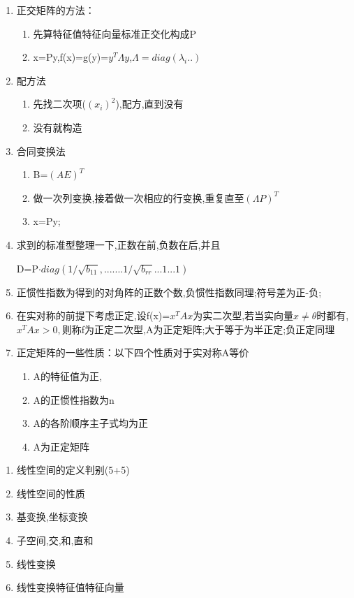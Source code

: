 \documentclass[11pt, a4paper, UTF8]{ctexart}
\begin{document}
\begin{solution}
\begin{enumerate}
  \item 正交矩阵的方法：
  \begin{enumerate}
    \item 先算特征值特征向量标准正交化构成P
    \item x=Py,f(x)=g(y)=$y^{T}\Lambda y$,$\Lambda =diag(\lambda _i..)$
  \end{enumerate}
  \item 配方法
  \begin{enumerate}
    \item 先找二次项($(x_i)^{2}$),配方,直到没有
    \item 没有就构造 
  \end{enumerate}
  \item 合同变换法
  \begin{enumerate}
    \item B=$(A E)^{T}$
    \item 做一次列变换,接着做一次相应的行变换,重复直至$(\Lambda P)^{T}$
    \item x=Py;
  \end{enumerate}
  \item 求到的标准型整理一下,正数在前,负数在后,并且
  
  D=P$\cdot diag(1/\sqrt{b_{11}},.......1/\sqrt{b_{rr}}...1...1)$
  \item 正惯性指数为得到的对角阵的正数个数,负惯性指数同理;符号差为正-负;
  \item 在实对称的前提下考虑正定,设f(x)=$x^{T}Ax$为实二次型,若当实向量$x\neq \theta $时都有,$x^{T}Ax>0,$则称f为正定二次型,A为正定矩阵;大于等于为半正定;负正定同理
  \item 正定矩阵的一些性质：以下四个性质对于实对称A等价
  \begin{enumerate}
    \item A的特征值为正,
    \item A的正惯性指数为n
    \item A的各阶顺序主子式均为正
    \item A为正定矩阵
  \end{enumerate} 
\end{enumerate}
\end{solution}
\begin{problem}[线性空间]
\begin{enumerate}
  \item 线性空间的定义判别(5+5)
  \item 线性空间的性质
  \item 基变换,坐标变换 
  \item 子空间,交,和,直和
  \item 线性变换
  \item 线性变换特征值特征向量
\end{enumerate}

\end{problem}
\end{document}
